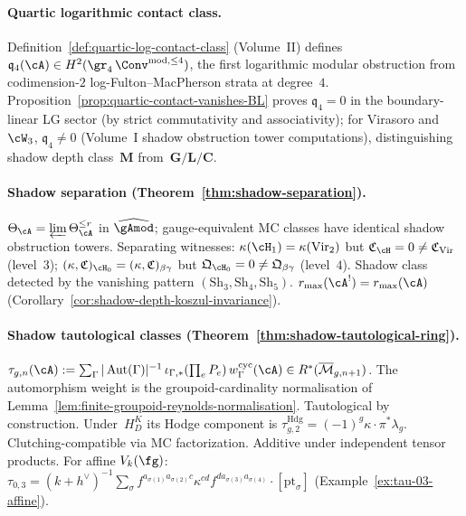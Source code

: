 \paragraph{Quartic logarithmic contact class.}
Definition~\ref{def:quartic-log-contact-class} (Volume~II) defines
$\mathfrak{q}_4(\cA) \in H^2(\gr_4\,\Conv^{\mathrm{mod},\leq 4})$,
the first logarithmic modular obstruction from codimension-$2$
log-Fulton--MacPherson strata at degree~$4$.
Proposition~\ref{prop:quartic-contact-vanishes-BL} proves
$\mathfrak{q}_4 = 0$ in the boundary-linear LG sector (by strict
commutativity and associativity); for Virasoro and $\cW_3$,
$\mathfrak{q}_4 \neq 0$ (Volume~I shadow obstruction tower computations),
distinguishing shadow depth class~$\mathbf{M}$ from~$\mathbf{G}/\mathbf{L}/\mathbf{C}$.

\paragraph{Shadow separation
\textup{(}Theorem~\textup{\ref{thm:shadow-separation}}\textup{)}.}
$\Theta_\cA = \varprojlim \Theta_\cA^{\leq r}$ in
$\widehat{\gAmod}$; gauge-equivalent MC classes have
identical shadow obstruction towers. Separating witnesses:
$\kappa(\cH_1) = \kappa(\mathrm{Vir}_2)$ but
$\mathfrak{C}_{\cH} = 0 \neq \mathfrak{C}_{\mathrm{Vir}}$
(level~$3$);
$(\kappa, \mathfrak{C})_{\cH_0}
= (\kappa, \mathfrak{C})_{\beta\gamma}$ but
$\mathfrak{Q}_{\cH_0} = 0 \neq
\mathfrak{Q}_{\beta\gamma}$ (level~$4$).
Shadow class detected by the vanishing pattern
$(\mathrm{Sh}_3, \mathrm{Sh}_4, \mathrm{Sh}_5)$.
$r_{\max}(\cA^!) = r_{\max}(\cA)$
(Corollary~\ref{cor:shadow-depth-koszul-invariance}).

\paragraph{Shadow tautological classes
\textup{(}Theorem~\textup{\ref{thm:shadow-tautological-ring}}\textup{)}.}
$\tau_{g,n}(\cA) :=
\sum_\Gamma |\operatorname{Aut}(\Gamma)|^{-1}\,
\iota_{\Gamma,*}(\prod_e P_e)\,
w_\Gamma^{\mathrm{cyc}}(\cA)
\in R^*(\overline{\mathcal{M}}_{g,n+1})$.
The automorphism weight is the groupoid-cardinality normalisation of
Lemma~\ref{lem:finite-groupoid-reynolds-normalisation}.
Tautological by construction.  Under~$H_D^K$ its Hodge component is
$\tau_{g,2}^{\mathrm{Hdg}}
=(-1)^g\kappa\cdot\pi^*\lambda_g$.
Clutching-compatible via MC factorization.
Additive under independent tensor products.
For affine $V_k(\fg)$:
$\tau_{0,3} = (k{+}h^\vee)^{-1}\sum_\sigma
f^{a_{\sigma(1)}a_{\sigma(2)}c}\kappa^{cd}
f^{da_{\sigma(3)}a_{\sigma(4)}} \cdot
[\mathrm{pt}_\sigma]$
(Example~\ref{ex:tau-03-affine}).

